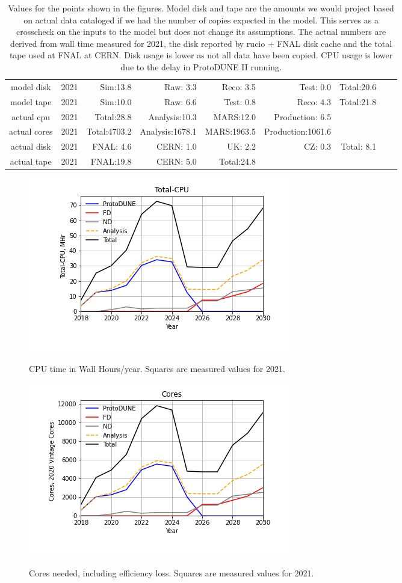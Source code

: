 \documentclass[12pt]{article}
\begin{document}
\begin{table}
\footnotesize
 \centering \begin{tabular}[h]{crrrrrrrr}
          model disk&2021&Sim:13.8&Raw: 3.3&Reco: 3.5&Test: 0.0&Total:20.6\\
          model tape&2021&Sim:10.0&Raw: 6.6&Test: 0.8&Reco: 4.3&Total:21.8\\
          actual cpu&2021&Total:28.8&Analysis:10.3&MARS:12.0&Production: 6.5\\
        actual cores&2021&Total:4703.2&Analysis:1678.1&MARS:1963.5&Production:1061.6\\
         actual disk&2021&FNAL: 4.6&CERN: 1.0&UK: 2.2&CZ: 0.3&Total: 8.1\\
         actual tape&2021&FNAL:19.8&CERN: 5.0&Total:24.8\\
\end{tabular}
\caption{Values for the points shown in the figures. Model disk and tape are the amounts we would project based on actual data cataloged if we had the number of copies expected in the model. This serves as a crosscheck on the inputs to the model but does not change its assumptions.  The actual numbers are derived from wall time measured for 2021, the disk reported by rucio + FNAL disk cache and the total tape used at FNAL at CERN. Disk usage is lower as not all data have been copied. CPU usage is lower due to the delay in ProtoDUNE II running.}\normalsize
 \end{table}
\pagebreak\begin{figure}
\centering\includegraphics[height=0.4\textwidth]{Total-CPU.png}\label{TotalCPU}
\caption{CPU time in Wall Hours/year. Squares are measured values for 2021.}
\end{figure}
\begin{figure}
\centering\includegraphics[height=0.4\textwidth]{Cores.png}\label{Cores}
\caption{Cores needed, including efficiency loss. Squares are measured values for 2021.}
\end{figure}
\end{document}
